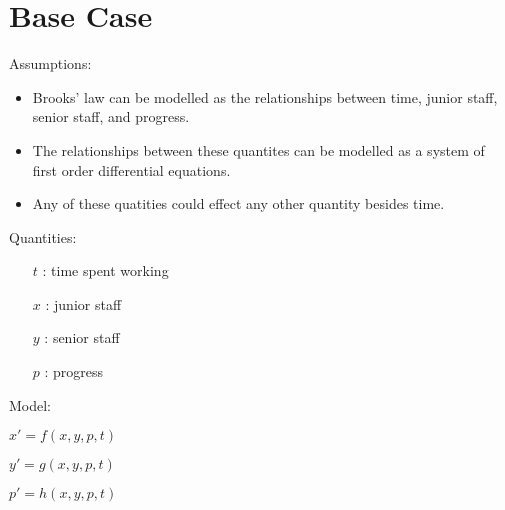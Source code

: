 \documentclass{article}
\newenvironment{atomize}
    {\begin{list} {} {
            \setlength\itemindent{0pt}
            \setlength\leftmargin{10pt}
            \setlength\labelwidth{0pt}
    }}
    {\end{list}}
\begin{document}
\section*{Base Case}
    \begin{atomize}
        \item Assumptions:
            \begin{itemize}
								\item Brooks' law can be modelled as the relationships between
								time, junior staff, senior staff, and progress.
								\item The relationships between these quantites can be modelled
								as a system of first order differential equations.
								\item Any of these quatities could effect any other quantity
								besides time.  
								\end{itemize}
        \item Quantities:
            \begin{itemize}
                \item [$t$]: time spent working
                \item [$x$]: junior staff
                \item [$y$]: senior staff
                \item [$p$]: progress
            \end{itemize}
        \item Model:
            \begin{atomize}
                \item $x\prime = f\left(x, y, p, t\right)$
                \item $y\prime = g\left(x, y, p, t\right)$
                \item $p\prime = h\left(x, y, p, t\right)$
            \end{atomize}
    \end{atomize}
\end{document}
